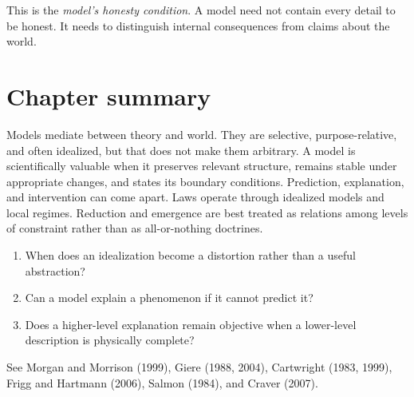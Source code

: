This is the \emph{model's honesty condition}. A model need not contain every
detail to be honest. It needs to distinguish internal consequences from
claims about the world.

\section*{Chapter summary}

Models mediate between theory and world. They are selective, purpose-relative,
and often idealized, but that does not make them arbitrary. A model is
scientifically valuable when it preserves relevant structure, remains stable
under appropriate changes, and states its boundary conditions. Prediction,
explanation, and intervention can come apart. Laws operate through idealized
models and local regimes. Reduction and emergence are best treated as
relations among levels of constraint rather than as all-or-nothing doctrines.

\begin{discussion}
\begin{enumerate}
\item When does an idealization become a distortion rather than a useful
abstraction?
\item Can a model explain a phenomenon if it cannot predict it?
\item Does a higher-level explanation remain objective when a lower-level
description is physically complete?
\end{enumerate}
\end{discussion}

\begin{furtherreading}
See Morgan and Morrison (1999), Giere (1988, 2004), Cartwright (1983, 1999),
Frigg and Hartmann (2006), Salmon (1984), and Craver (2007).
\end{furtherreading}

